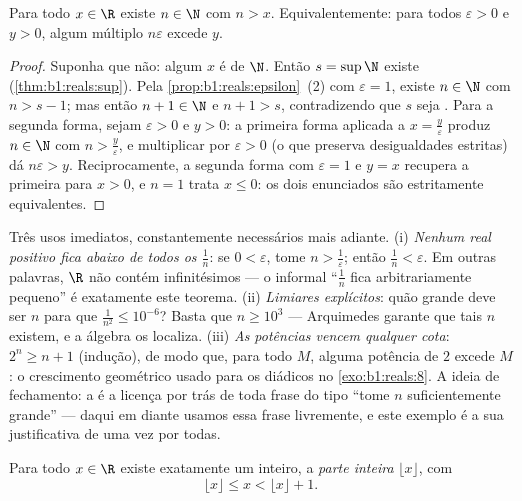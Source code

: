 \begin{theorem}\label{thm:b1:reals:archimedes}
Para todo $x \in \R$ existe $n \in \N$ com $n > x$. Equivalentemente:
para todos $\varepsilon > 0$ e $y > 0$, algum múltiplo $n\varepsilon$
excede $y$.
\end{theorem}

\begin{proof}
Suponha que não: algum $x$ é  de $\N$. Então $s = \sup \N$
existe (\cref{thm:b1:reals:sup}). Pela
\cref{prop:b1:reals:epsilon}~(2) com $\varepsilon = 1$, existe $n
\in \N$ com $n > s - 1$; mas então $n + 1 \in \N$ e $n + 1 > s$,
contradizendo que $s$ seja . Para a segunda forma,
sejam $\varepsilon > 0$ e $y > 0$: a primeira forma aplicada a $x
= \frac{y}{\varepsilon}$ produz $n \in \N$ com $n >
\frac{y}{\varepsilon}$, e multiplicar por $\varepsilon > 0$
(o que preserva desigualdades estritas) dá $n\varepsilon > y$.
Reciprocamente, a segunda forma com $\varepsilon = 1$ e $y = x$
recupera a primeira para $x > 0$, e $n = 1$ trata $x \leq 0$:
os dois enunciados são estritamente equivalentes.
\end{proof}

\begin{example}\label{ex:b1:reals:archimedeswork}
Três usos imediatos, constantemente necessários mais adiante. (i) \emph{Nenhum
real positivo fica abaixo de todos os $\frac1n$}: se $0 < \varepsilon$,
tome $n > \frac1\varepsilon$; então $\frac1n < \varepsilon$. Em
outras palavras, $\R$ não contém infinitésimos --- o informal
``$\frac1n$ fica arbitrariamente pequeno'' é exatamente este teorema.
(ii) \emph{Limiares explícitos}: quão grande deve ser $n$ para que
$\frac{1}{n^2} \leq 10^{-6}$? Basta que $n \geq 10^3$
--- Arquimedes garante que tais $n$ existem, e a álgebra
os localiza. (iii) \emph{As potências vencem qualquer cota}: $2^n \geq n +
1$ (indução), de modo que, para todo $M$, alguma potência de $2$
excede $M$: o crescimento geométrico usado para os diádicos no
\cref{exo:b1:reals:8}. A ideia de fechamento: a  é a licença por trás de toda frase do tipo ``tome
$n$ suficientemente grande'' --- daqui em diante usamos essa frase
livremente, e este exemplo é a sua justificativa de uma vez por todas.
\end{example}

\begin{theorem}\label{thm:b1:reals:floor}
Para todo $x \in \R$ existe exatamente um inteiro, a
\emph{parte inteira} $\lfloor x \rfloor$, com
\[
\lfloor x \rfloor \leq x < \lfloor x \rfloor + 1 .
\]
\end{theorem}

